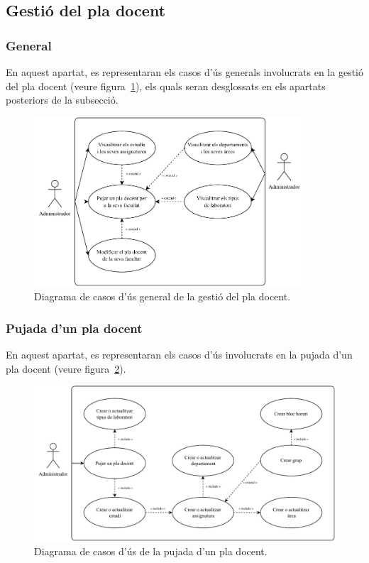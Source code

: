 \documentclass[a4paper,12pt]{ThesisStyle}
\begin{document}
\subsection{Gestió del pla docent}
\label{subsec:casos_us_pla}

\subsubsection{General}

En aquest apartat, es representaran els casos d'ús generals involucrats en la gestió del pla docent (veure figura~\ref{img:casos_us_pla_general}), els quals seran desglossats en els apartats posteriors de la subsecció.

\begin{figure}[H]
  \centering
  \includegraphics[width=0.9\textwidth]{assets/use_cases/pla_docent/general.pdf}
  \caption{\label{img:casos_us_pla_general}Diagrama de casos d'ús general de la gestió del pla docent.}
\end{figure}

\subsubsection{Pujada d'un pla docent}

En aquest apartat, es representaran els casos d'ús involucrats en la pujada d'un pla docent (veure figura~\ref{img:casos_us_pla_pujada}).

\begin{figure}[H]
  \centering
  \includegraphics[width=\textwidth]{assets/use_cases/pla_docent/pujada.pdf}
  \caption{\label{img:casos_us_pla_pujada}Diagrama de casos d'ús de la pujada d'un pla docent.}
\end{figure}
\end{document}
